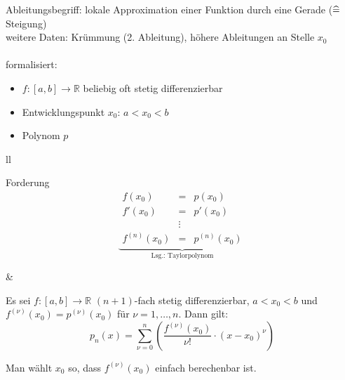 Ableitungsbegriff: lokale Approximation einer Funktion durch eine Gerade ($\mathrel{\widehat{=}}$ Steigung)\\
weitere Daten: Krümmung (2. Ableitung), höhere Ableitungen an Stelle $x_0$\\\\
formalisiert:
\begin{itemize}
  \item $f: [a,b] \to \mathbb{R}$ beliebig oft stetig differenzierbar
  \item Entwicklungspunkt $x_0$: $a < x_0 < b$
  \item Polynom $p$
\end{itemize}
\noindent
\begin{tabular}{ll}
  \begin{minipage}[b]{.5\textwidth}
    Forderung
    \[
      \underbrace{\begin{array}{rcl}
        f(x_0) &=& p(x_0) \\
        f'(x_0) &=& p'(x_0) \\
        &\vdots& \\
        f^{(n)}(x_0) &=& p^{(n)}(x_0)
      \end{array}}_{\text{Lsg.: Taylorpolynom}}
    \]
  \end{minipage} &
\end{tabular}

\begin{theorem} Es sei $f: [a,b] \to \mathbb{R}$ $(n+1)$-fach stetig differenzierbar, $a < x_0 < b$ und $f^{(\nu)}(x_0) = p^{(\nu)}(x_0)$ für $\nu = 1, \ldots, n$. Dann gilt:
  \[ p_n(x) = \sum_{\nu = 0}^n \left( \frac{f^{(\nu)}(x_0)}{\nu !} \cdot (x - x_0)^\nu \right)\]
\end{theorem}

\begin{note}
  Man wählt $x_0$ so, dass $f^{(\nu)}(x_0)$ einfach berechenbar ist.
\end{note}


